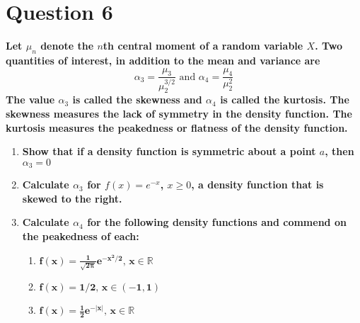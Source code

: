\documentclass{article}
\newcommand{\R}{\mathbb{R}}
\begin{document}
\section*{Question 6}
\textbf{Let $\mu_n$ denote the $n$th central moment of a random variable $X$. Two quantities of interest, in addition to the mean and variance are}
\[
	\alpha_3 = \dfrac{\mu_3}{\mu_2^{3/2}}\text{ and }\alpha_4=\dfrac{\mu_4}{\mu_2^2}
\]
\textbf{The value $\alpha_3$ is called the skewness and $\alpha_4$ is called the kurtosis. The skewness measures the lack of symmetry in the density function. The kurtosis measures the peakedness or flatness of the density function.}
\begin{enumerate}
	\item \textbf{Show that if a density function is symmetric about a point $a$, then $\alpha_3=0$}
		\bigskip \\
		
		
	\item \textbf{Calculate $\alpha_3$ for $f(x)=e^{-x}$, $x\geq0$, a density function that is skewed to the right.}
		\bigskip \\
	
	
	\item \textbf{Calculate $\alpha_4$ for the following density functions and commend on the peakedness of each:}
		\begin{enumerate}
			\item $\mathbf{f(x)=\frac{1}{\sqrt{2\pi}}e^{-x^2/2}\text{, }x\in\R}$
				\bigskip \\
			
			\item $\mathbf{f(x)=1/2\text{, }x\in(-1,1)}$
				\bigskip \\
			\item $\mathbf{f(x)=\frac{1}{2}e^{-|x|}\text{, }x\in\R}$
				\bigskip \\
		\end{enumerate}
		
		
\end{enumerate}

\end{document}
